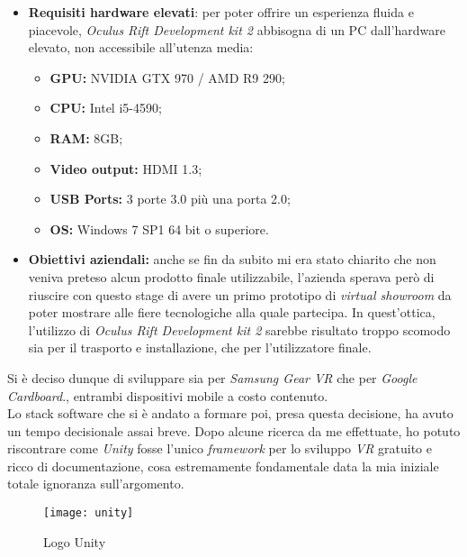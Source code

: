 \begin{itemize}
	\item \textbf{Requisiti hardware elevati}: per poter offrire un esperienza fluida e piacevole, \textit{Oculus Rift Development kit 2} abbisogna di un PC dall'hardware elevato, non accessibile all'utenza media:
	\begin{itemize}
		\item \textbf{GPU:} NVIDIA GTX 970 / AMD R9 290;
		\item \textbf{CPU:} Intel i5-4590;
		\item \textbf{RAM:} 8GB;
		\item \textbf{Video output:} HDMI 1.3;
		\item \textbf{USB Ports:} 3 porte 3.0 più una porta 2.0;
		\item \textbf{OS:} Windows 7 SP1 64 bit o superiore.
	\end{itemize}
	
	\item \textbf{Obiettivi aziendali:} anche se fin da subito mi era stato chiarito che non veniva preteso alcun prodotto finale utilizzabile, l'azienda sperava però di riuscire con questo stage di avere un primo prototipo di \textit{virtual showroom} da poter mostrare alle fiere tecnologiche alla quale partecipa. In quest'ottica, l'utilizzo di \textit{Oculus Rift Development kit 2} sarebbe risultato troppo scomodo sia per il trasporto e installazione, che per l'utilizzatore finale.
\end{itemize}

Si è deciso dunque di sviluppare sia per \textit{Samsung Gear VR} che per \textit{Google Cardboard}., entrambi dispositivi mobile a costo contenuto. \\
Lo stack software che si è andato a formare poi, presa questa decisione, ha avuto un tempo decisionale assai breve. Dopo alcune ricerca da me effettuate, ho potuto riscontrare come \textit{Unity} fosse l'unico \textit{framework} per lo sviluppo \textit{VR} gratuito e ricco di documentazione, cosa estremamente fondamentale data la mia iniziale totale ignoranza sull'argomento.

\label{Unity}
\begin{figure}[ht]
	\begin{center}
		\texttt{[image: unity]}
		\caption{Logo Unity}
	\end{center}
\end{figure}
\FloatBarrier

